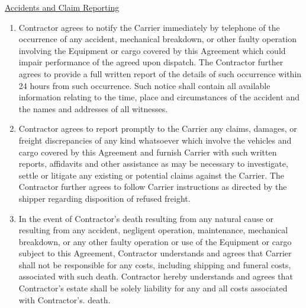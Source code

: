 \underline{Accidents and Claim Reporting}
\begin{enumerate}
    \item Contractor agrees to notify the Carrier immediately by telephone
    of the occurrence of any accident, mechanical breakdown, or other
    faulty operation involving the Equipment or cargo covered by this
    Agreement which could impair performance of the agreed upon dispatch.
    The Contractor further agrees to provide a full written report of the
    details of such occurrence within 24 hours from such occurrence. Such
    notice shall contain all available information relating to the time,
    place and circumstances of the accident and the names and addresses of
    all witnesses.

    \item Contractor agrees to report promptly to the Carrier any claims,
    damages, or freight discrepancies of any kind whatsoever which involve
    the vehicles and cargo covered by this Agreement and furnish Carrier
    with such written reports, affidavits and other assistance as may be
    necessary to investigate, settle or litigate any existing or potential
    claims against the Carrier. The Contractor further agrees to follow
    Carrier instructions as directed by the shipper regarding disposition
    of refused freight.

    \item In the event of Contractor's death resulting from any natural
    cause or resulting from any accident, negligent operation, maintenance,
    mechanical breakdown, or any other faulty operation or use of the
    Equipment or cargo subject to this Agreement, Contractor understands
    and agrees that Carrier shall not be responsible for any costs,
    including shipping and funeral costs, associated with such death.
    Contractor hereby understands and agrees that Contractor's estate shall
    be solely liability for any and all costs associated with Contractor's.
    death.
\end{enumerate}